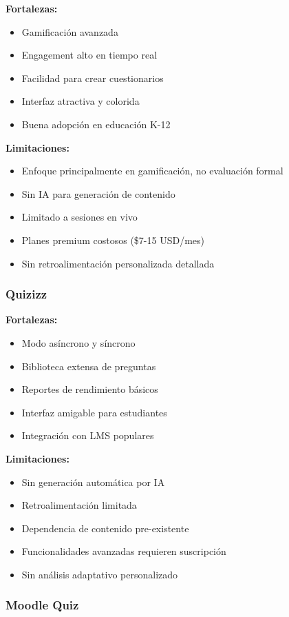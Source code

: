 \documentclass[12pt,a4paper]{report}
\begin{document}
\textbf{Fortalezas:}
\begin{itemize}
\item Gamificación avanzada
\item Engagement alto en tiempo real
\item Facilidad para crear cuestionarios
\item Interfaz atractiva y colorida
\item Buena adopción en educación K-12
\end{itemize}

\textbf{Limitaciones:}
\begin{itemize}
\item Enfoque principalmente en gamificación, no evaluación formal
\item Sin IA para generación de contenido
\item Limitado a sesiones en vivo
\item Planes premium costosos (\$7-15 USD/mes)
\item Sin retroalimentación personalizada detallada
\end{itemize}

\subsubsection{Quizizz}

\textbf{Fortalezas:}
\begin{itemize}
\item Modo asíncrono y síncrono
\item Biblioteca extensa de preguntas
\item Reportes de rendimiento básicos
\item Interfaz amigable para estudiantes
\item Integración con LMS populares
\end{itemize}

\textbf{Limitaciones:}
\begin{itemize}
\item Sin generación automática por IA
\item Retroalimentación limitada
\item Dependencia de contenido pre-existente
\item Funcionalidades avanzadas requieren suscripción
\item Sin análisis adaptativo personalizado
\end{itemize}

\subsubsection{Moodle Quiz}
\end{document}
